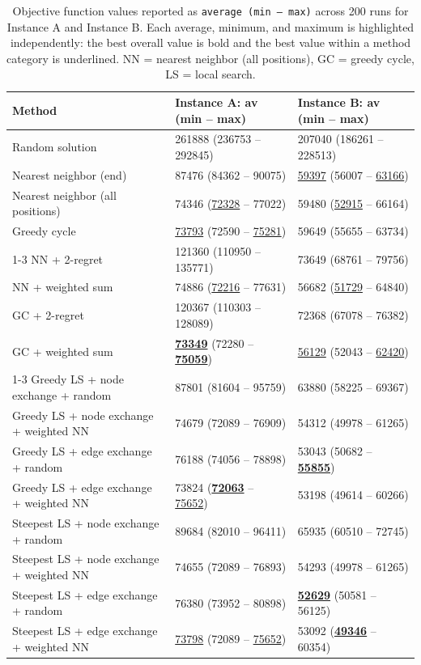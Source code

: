 \begin{table}[h!]
\centering
\footnotesize
\setlength{\tabcolsep}{3pt}
\renewcommand{\arraystretch}{1.5}
\caption{Objective function values reported as \texttt{average (min -- max)} across 200 runs for Instance A and Instance B. Each average, minimum, and maximum is highlighted independently: the best overall value is bold and the best value within a method category is underlined. NN = nearest neighbor (all positions), GC = greedy cycle, LS = local search.}
\label{tab:obj_results}
\vspace{0.5em}
\begin{tabularx}{\textwidth}{p{7.2cm} X X}
\toprule
\textbf{Method} & \textbf{Instance A: av (min -- max)} & \textbf{Instance B: av (min -- max)} \\
\midrule
Random solution & 261888 (236753 -- 292845) & 207040 (186261 -- 228513) \\
Nearest neighbor (end) & 87476 (84362 -- 90075) & \underline{59397} (56007 -- \underline{63166}) \\
Nearest neighbor (all positions) & 74346 (\underline{72328} -- 77022) & 59480 (\underline{52915} -- 66164) \\
Greedy cycle & \underline{73793} (72590 -- \underline{75281}) & 59649 (55655 -- 63734) \\
\cmidrule{1-3}
NN + 2-regret & 121360 (110950 -- 135771) & 73649 (68761 -- 79756) \\
NN + weighted sum & 74886 (\underline{72216} -- 77631) & 56682 (\underline{51729} -- 64840) \\
GC + 2-regret & 120367 (110303 -- 128089) & 72368 (67078 -- 76382) \\
GC + weighted sum & \textbf{\underline{73349}} (72280 -- \textbf{\underline{75059}}) & \underline{56129} (52043 -- \underline{62420}) \\
\cmidrule{1-3}
Greedy LS + node exchange + random & 87801 (81604 -- 95759) & 63880 (58225 -- 69367) \\
Greedy LS + node exchange + weighted NN & 74679 (72089 -- 76909) & 54312 (49978 -- 61265) \\
Greedy LS + edge exchange + random & 76188 (74056 -- 78898) & 53043 (50682 -- \textbf{\underline{55855}}) \\
Greedy LS + edge exchange + weighted NN & 73824 (\textbf{\underline{72063}} -- \underline{75652}) & 53198 (49614 -- 60266) \\
Steepest LS + node exchange + random & 89684 (82010 -- 96411) & 65935 (60510 -- 72745) \\
Steepest LS + node exchange + weighted NN & 74655 (72089 -- 76893) & 54293 (49978 -- 61265) \\
Steepest LS + edge exchange + random & 76380 (73952 -- 80898) & \textbf{\underline{52629}} (50581 -- 56125) \\
Steepest LS + edge exchange + weighted NN & \underline{73798} (72089 -- \underline{75652}) & 53092 (\textbf{\underline{49346}} -- 60354) \\
\bottomrule
\end{tabularx}
\end{table}

